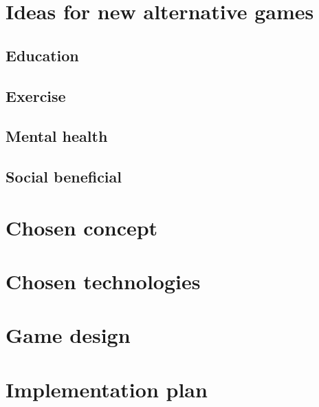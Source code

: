 \documentclass[../Main.tex]{subfiles}
\begin{document}
\section{Ideas for new alternative games}
\subsection{Education}
\subsection{Exercise}
\subsection{Mental health}
\subsection{Social beneficial}
\section{Chosen concept}
\section{Chosen technologies}
\section{Game design}
\section{Implementation plan}

\biblio %
\end{document}
